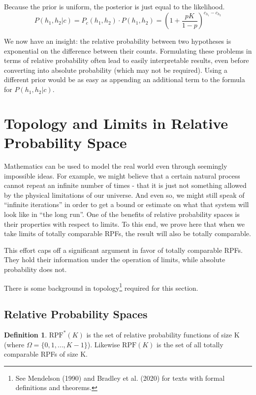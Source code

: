 \documentclass[twoside]{article}
\newcommand{\quotes}[1]{``#1''}
\theoremstyle{plain}%
\theoremstyle{definition}
\newtheorem{definition}{Definition}[section]
\theoremstyle{remark}
\begin{document}
Because the prior is uniform, the posterior is just equal to the likelihood.
\[P(h_1, h_2 | c) = P_c(h_1, h_2) \cdot P(h_1, h_2) = \left(1 + \frac{pK}{1-p}\right)^{c_{h_1} - c_{h_2}} \]

We now have an insight: the relative probability between two hypotheses is exponential on the difference between their counts. Formulating these problems in terms of relative probability often lead to easily interpretable results, even before converting into absolute probability (which may not be required). Using a different prior would be as easy as appending an additional term to the formula for \(P(h_1, h_2|c)\).

\section{Topology and Limits in Relative Probability Space}
\label{section:topology}

Mathematics can be used to model the real world even through seemingly impossible ideas. For example, we might believe that a certain natural process cannot repeat an infinite number of times - that it is just not something allowed by the physical limitations of our universe. And even so, we might still speak of \quotes{infinite iterations} in order to get a bound or estimate on what that system will look like in \quotes{the long run}. One of the benefits of relative probability spaces is their properties with respect to limits. To this end, we prove here that when we take limits of totally comparable RPFs, the result will also be totally comparable.

This effort caps off a significant argument in favor of totally comparable RPFs. They hold their information under the operation of limits, while absolute probability does not.

There is some background in topology\footnote{See Mendelson (1990) \cite{mendelson} and Bradley et al. (2020) \cite{bradley} for texts with formal definitions and theorems.} required for this section.

\subsection{Relative Probability Spaces}

\begin{definition}
\(\text{RPF}^{\ast}(K)\) is the set of relative probability functions of size K (where \(\Omega = \{0, 1, ..., K - 1\}\)). Likewise \(\text{RPF}(K)\) is the set of all totally comparable RPFs of size K.
\end{definition}
\end{document}
